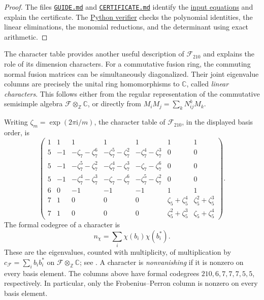 \documentclass{amsart}
\begin{document}
\begin{proof}
The files \href{https://github.com/sebastienpalcoux/triangular-prism-categorification/blob/f816c697fde088b261e1fe1ce703980e5dbdab51/GUIDE.md}{\texttt{GUIDE.md}} and \href{https://github.com/sebastienpalcoux/triangular-prism-categorification/blob/f816c697fde088b261e1fe1ce703980e5dbdab51/CERTIFICATE.md}{\texttt{CERTIFICATE.md}} identify the \href{https://github.com/sebastienpalcoux/triangular-prism-categorification/blob/f816c697fde088b261e1fe1ce703980e5dbdab51/data/f210-equations.json}{input equations} and explain the certificate. The \href{https://github.com/sebastienpalcoux/triangular-prism-categorification/blob/f816c697fde088b261e1fe1ce703980e5dbdab51/verify_f210.py}{Python verifier} checks the polynomial identities, the linear eliminations, the monomial reductions, and the determinant using exact arithmetic.

\end{proof}



The character table provides another useful description of
$\mathcal F_{210}$ and explains the role of its dimension characters.
For a commutative fusion ring, the commuting normal fusion matrices can be
simultaneously diagonalized. Their joint eigenvalue columns are precisely
the unital ring homomorphisms to $\mathbb C$, called \emph{linear characters}.
This follows either from the regular representation of the commutative
semisimple algebra $\mathcal F\otimes_{\mathbb Z}\mathbb C$, or directly
from $M_iM_j=\sum_kN_{ij}^kM_k$.

Writing $\zeta_m=\exp(2\pi\mathrm i/m)$, the character table of
$\mathcal F_{210}$, in the displayed basis order, is
\[
\begin{pmatrix}
1&1&1&1&1&1&1\\
5&-1&-\zeta_7-\zeta_7^6&-\zeta_7^5-\zeta_7^2&-\zeta_7^4-\zeta_7^3&0&0\\
5&-1&-\zeta_7^5-\zeta_7^2&-\zeta_7^4-\zeta_7^3&-\zeta_7-\zeta_7^6&0&0\\
5&-1&-\zeta_7^4-\zeta_7^3&-\zeta_7-\zeta_7^6&-\zeta_7^5-\zeta_7^2&0&0\\
6&0&-1&-1&-1&1&1\\
7&1&0&0&0&\zeta_5+\zeta_5^4&\zeta_5^2+\zeta_5^3\\
7&1&0&0&0&\zeta_5^2+\zeta_5^3&\zeta_5+\zeta_5^4
\end{pmatrix}.
\]
The formal codegree of a character is
\begin{equation}\label{def:formalco}
 n_\chi=\sum_i\chi(b_i)\chi(b_i^*).
\end{equation}
These are the eigenvalues, counted with multiplicity, of multiplication by
$c_{\mathcal F}=\sum_i b_i b_i^*$ on
$\mathcal F\otimes_{\mathbb Z}\mathbb C$; see \cite[\S2.3]{Os15}.
A character is \emph{nonvanishing} if it is nonzero on every basis element.
The columns above have formal codegrees $210,6,7,7,7,5,5$, respectively.
In particular, only the Frobenius--Perron column is nonzero on every basis
element.
\end{document}
